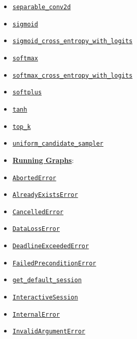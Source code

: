 \begin{itemize}
\item
  \href{../../api_docs/python/nn.md\#separable_conv2d}{\texttt{separable\_conv2d}}
\item
  \href{../../api_docs/python/nn.md\#sigmoid}{\texttt{sigmoid}}
\item
  \href{../../api_docs/python/nn.md\#sigmoid_cross_entropy_with_logits}{\texttt{sigmoid\_cross\_entropy\_with\_logits}}
\item
  \href{../../api_docs/python/nn.md\#softmax}{\texttt{softmax}}
\item
  \href{../../api_docs/python/nn.md\#softmax_cross_entropy_with_logits}{\texttt{softmax\_cross\_entropy\_with\_logits}}
\item
  \href{../../api_docs/python/nn.md\#softplus}{\texttt{softplus}}
\item
  \href{../../api_docs/python/nn.md\#tanh}{\texttt{tanh}}
\item
  \href{../../api_docs/python/nn.md\#top_k}{\texttt{top\_k}}
\item
  \href{../../api_docs/python/nn.md\#uniform_candidate_sampler}{\texttt{uniform\_candidate\_sampler}}
\item
  \textbf{\href{../../api_docs/python/client.md}{Running Graphs}}:
\item
  \href{../../api_docs/python/client.md\#AbortedError}{\texttt{AbortedError}}
\item
  \href{../../api_docs/python/client.md\#AlreadyExistsError}{\texttt{AlreadyExistsError}}
\item
  \href{../../api_docs/python/client.md\#CancelledError}{\texttt{CancelledError}}
\item
  \href{../../api_docs/python/client.md\#DataLossError}{\texttt{DataLossError}}
\item
  \href{../../api_docs/python/client.md\#DeadlineExceededError}{\texttt{DeadlineExceededError}}
\item
  \href{../../api_docs/python/client.md\#FailedPreconditionError}{\texttt{FailedPreconditionError}}
\item
  \href{../../api_docs/python/client.md\#get_default_session}{\texttt{get\_default\_session}}
\item
  \href{../../api_docs/python/client.md\#InteractiveSession}{\texttt{InteractiveSession}}
\item
  \href{../../api_docs/python/client.md\#InternalError}{\texttt{InternalError}}
\item
  \href{../../api_docs/python/client.md\#InvalidArgumentError}{\texttt{InvalidArgumentError}}

\end{itemize}
